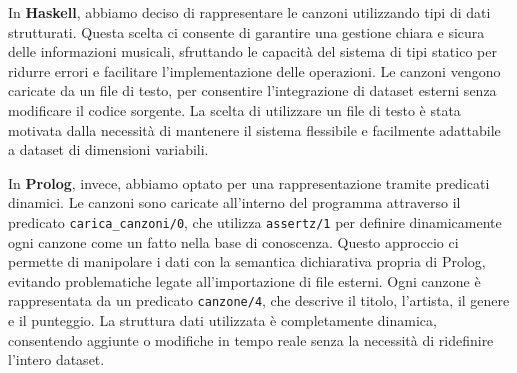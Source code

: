 \documentclass[a4paper,11pt]{article}
\begin{document}
In \textbf{Haskell}, abbiamo deciso di rappresentare le canzoni utilizzando tipi di dati strutturati. Questa scelta ci consente di garantire una gestione chiara e sicura delle informazioni musicali, sfruttando le capacità del sistema di tipi statico per ridurre errori e facilitare l'implementazione delle operazioni. Le canzoni vengono caricate da un file di testo, per consentire l'integrazione di dataset esterni senza modificare il codice sorgente. La scelta di utilizzare un file di testo è stata motivata dalla necessità di mantenere il sistema flessibile e facilmente adattabile a dataset di dimensioni variabili.

In \textbf{Prolog}, invece, abbiamo optato per una rappresentazione tramite predicati dinamici. Le canzoni sono caricate all’interno del programma attraverso il predicato \texttt{carica\_canzoni/0}, che utilizza \texttt{assertz/1} per definire dinamicamente ogni canzone come un fatto nella base di conoscenza. Questo approccio ci permette di manipolare i dati con la semantica dichiarativa propria di Prolog, evitando problematiche legate all’importazione di file esterni. Ogni canzone è rappresentata da un predicato \texttt{canzone/4}, che descrive il titolo, l’artista, il genere e il punteggio. La struttura dati utilizzata è completamente dinamica, consentendo aggiunte o modifiche in tempo reale senza la necessità di ridefinire l’intero dataset.
\end{document}

